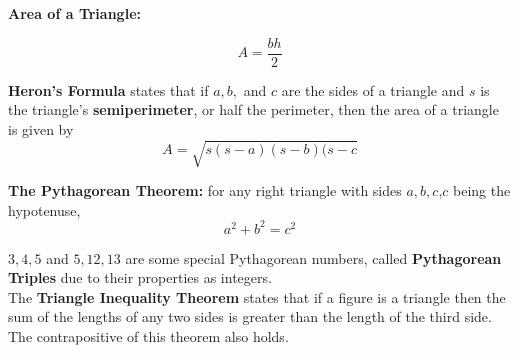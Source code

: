 \documentclass{article}
\begin{document}
            \noindent \color{purple} \textbf{Area of a Triangle:} \color{black}

            \begin{equation*}
                A=\frac{bh}{2}
            \end{equation*}

            \begin{center}
            \end{center}

            \noindent \color{purple} \textbf{Heron's Formula} \color{black} states that if $a,b,$ and
            $c$ are the sides of a triangle and $s$ is the triangle's \textbf{semiperimeter}, or half
            the perimeter, then the area of a triangle is given by \\

            \begin{equation*}
                A = \sqrt{s(s-a)(s-b)(s-c}
            \end{equation*}

            \noindent \color{purple} \textbf{The Pythagorean Theorem:} \color{black} for any right
            triangle with sides $a,b,c$,$c$ being the hypotenuse, \\

            \begin{equation*}
                a^2 + b^2 = c^2
            \end{equation*}

            \noindent $3,4,5$ and $5,12,13$ are some special Pythagorean numbers, called
            \textbf{Pythagorean Triples} due to their properties as integers. \\

            \noindent The \color{purple} \textbf{Triangle Inequality Theorem} \color{black} states
            that if a figure is a triangle then the sum of the lengths of any two sides is greater
            than the length of the third side. The contrapositive of this theorem also holds.
\end{document}

